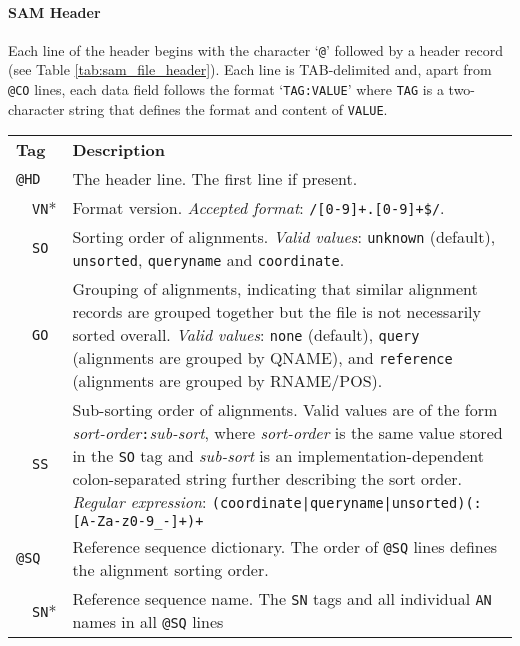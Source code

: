 \paragraph{SAM Header}
Each line of the header begins with the character `{\tt @}' followed by a header record (see Table \ref{tab:sam_file_header}). Each line is TAB-delimited and, apart from {\tt @CO} lines,
each data field follows the format `{\tt TAG:VALUE}' where {\tt TAG} is a two-character string that defines the format and content of {\tt VALUE}.

\begin{table}
    \caption{SAM file header record and column definition. Tags listed with `*' are required. (adapted from https://samtools.github.io/hts-specs/SAMv1.pdf)}
    \label{tab:sam_file_header}
\small
\begin{longtable}{|l|l|p{13.5cm}|}
  \cline{1-3}
  \multicolumn{2}{|l|}{\bf Tag} & {\bf Description} \\
  \cline{1-3}
  \multicolumn{2}{|l}{\tt @HD} & The header line. The first line if present. \\\cline{2-3}
  & {\tt VN}* & Format version. \emph{Accepted format}: {\tt /\char94[0-9]+\char92.[0-9]+\$/}.\\\cline{2-3}
  & {\tt SO} & Sorting order of alignments. \emph{Valid values}: {\tt unknown} (default), {\tt
    unsorted}, {\tt queryname} and {\tt coordinate}.\\\cline{2-3}
  & {\tt GO} & Grouping of alignments, indicating that similar alignment records
    are grouped together but the file is not necessarily sorted overall.
    \emph{Valid values}: {\tt none} (default), {\tt query} (alignments are
    grouped by {\sf QNAME}), and {\tt reference} (alignments are grouped by
    {\sf RNAME}/{\sf POS}).\\\cline{1-3}
  & {\tt SS} & Sub-sorting order of alignments. Valid values are of the form \emph{sort-order}{\tt :}\emph{sub-sort}, where \emph{sort-order} is the same value stored in the {\tt SO} tag and \emph{sub-sort} is an implementation-dependent colon-separated string further describing the sort order. 
    \emph{Regular expression}: {\tt (coordinate|queryname|unsorted)(:[\verb"A-Za-z0-9_-"]+)+}\\\cline{1-3}
  \multicolumn{2}{|l}{\tt @SQ} & Reference sequence dictionary. The order of {\tt @SQ} lines defines the alignment sorting order.\\\cline{2-3}
  & {\tt SN}* & Reference sequence name.
The {\tt SN} tags and all individual {\tt AN} names in all {\tt @SQ} lines

\end{longtable}
\end{table}
